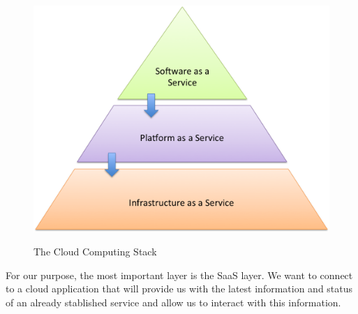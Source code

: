 \begin{figure}[H]
    \begin{center}
        {\includegraphics[width=.85\linewidth]{gfx/ipsaas}}
        \caption[The Cloud Computing Stack]{The Cloud Computing Stack}\label{fig:ipsaas}
    \end{center}
\end{figure}

For our purpose, the most important layer is the \ac{SaaS} layer. We want to connect to a cloud application that will provide us with the latest information and status of an already stablished service and allow us to interact with this information. 







    





